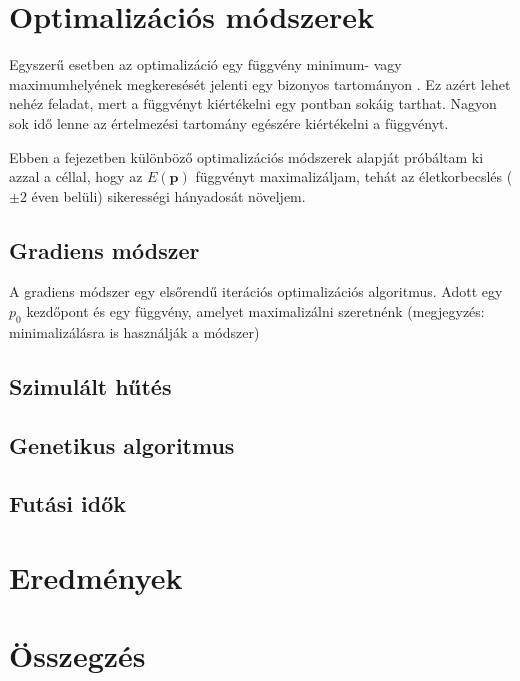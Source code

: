 \documentclass[12pt]{article}
\begin{document}
\section{Optimalizációs módszerek}
Egyszerű esetben az optimalizáció egy függvény minimum- vagy maximumhelyének megkeresését jelenti egy bizonyos tartományon \cite{Holder}. \iffalse TODO: példa a prog opt.-ról? \fi Ez azért lehet nehéz feladat, mert a függvényt kiértékelni egy pontban sokáig tarthat. Nagyon sok idő lenne az értelmezési tartomány egészére kiértékelni a függvényt.

Ebben a fejezetben különböző optimalizációs módszerek alapját próbáltam ki azzal a céllal, hogy az $E(\mathbf{p})$ függvényt maximalizáljam, tehát az életkorbecslés ($\pm 2$ éven belüli) sikerességi hányadosát növeljem.
\subsection{Gradiens módszer}
A gradiens módszer egy elsőrendű iterációs optimalizációs algoritmus. Adott egy $p_0$ kezdőpont és egy függvény, amelyet maximalizálni szeretnénk (megjegyzés: minimalizálásra is használják a módszer) \cite{gradient}
\subsection{Szimulált hűtés}
\subsection{Genetikus algoritmus}
\subsection{Futási idők}
\section{Eredmények}
\section{Összegzés}

\end{document}
